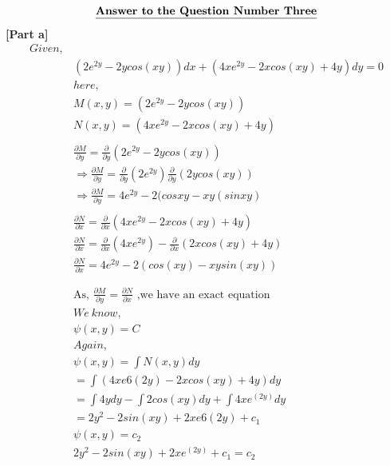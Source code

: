 \documentclass{article}
\begin{document}
\begin{homeworkProblem}
    \[      \textbf{\underline{Answer to the Question Number Three}}
    \]
    \textbf{[Part a]}
    \\
    \[
    \begin{split}
    Given,
    \\
    &(2 e^{2y} - 2y cos(xy)) dx + (4xe^{2y} - 2x cos(xy) + 4y ) dy =0
    \\
    &here,
    \\
    &M(x,y) = (2 e^{2y} - 2y cos (xy))
    \\
    &N(x,y) = (4xe^{2y} - 2 x cos (xy) + 4y)
    \\
    \\
    &\frac{\partial M}{\partial y} = \frac{\partial }{\partial y} (2 e^{2y} - 2y cos(xy))
    \\
    &\Rightarrow \frac{\partial M}{\partial y} = \frac{\partial }{\partial y} (2 e^{2y}) \frac{\partial}{\partial y} (2 y cos(xy))
    \\
    &\Rightarrow \frac{\partial M}{\partial y} = 4 e^{2y} - 2 (cosxy - xy(sinxy)
    \\
    \\
    & \frac{\partial N}{\partial x} = \frac{\partial }{\partial x} (4 x e^{2y} - 2 x cos(xy) + 4y)
    \\
     & \frac{\partial N}{\partial x} = \frac{\partial}{\partial x} (4 x e^{2y}) - \frac{\partial }{\partial x} (2x cos (xy) + 4y)
     \\
      & \frac{\partial N}{\partial x} = 4 e^{2y} - 2( cos (xy) - xy sin (xy))
      \\ \\ \\
      &\text{As, $\frac{\partial M}{\partial y} = \frac{\partial N}{\partial x}$ ,we have an exact equation}\\
   & We\: know,\\
    & \psi (x,y) = C\\
& Again,\\
&\psi (x,y) = \int N(x,y)dy \\
& = \int (4xe6(2y)-2xcos(xy)+4y)dy\\
& = \int 4ydy - \int 2cos(xy)dy+ \int 4xe^(2y)dy\\
& = 2y^2 - 2sin(xy)+2xe6(2y)+c_1\\
&\psi (x,y) = c_2\\
& 2y^2 - 2sin(xy)+2xe^(2y)+c_1 = c_2\\

\end{split}\]
\end{homeworkProblem}
\end{document}
